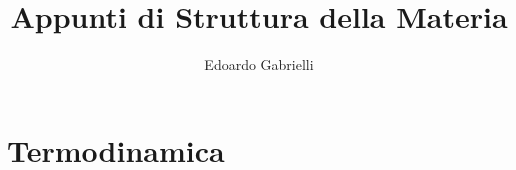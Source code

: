 \documentclass[a4paper]{report}
\author{Edoardo Gabrielli}
\title{Appunti di Struttura della Materia}
\renewcommand{\[}{\begin{equation}}
\renewcommand{\]}{\end{equation}}
\begin{document}
\maketitle
\clearpage
\tableofcontents
\chapter{Termodinamica}








\end{document}
